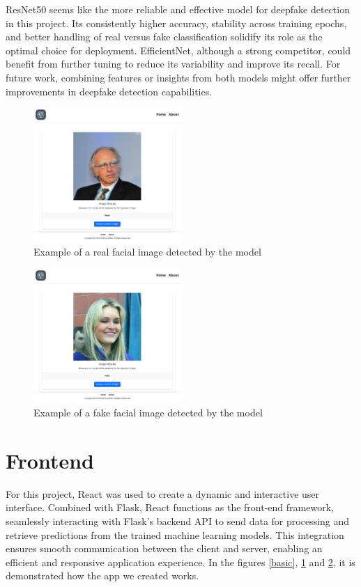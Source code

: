 \documentclass[conference]{IEEEtran}
\begin{document}
ResNet50 seems like the more reliable and effective model for deepfake detection in this project. Its consistently higher accuracy, stability across training epochs, and better handling of real versus fake classification solidify its role as the optimal choice for deployment. EfficientNet, although a strong competitor, could benefit from further tuning to reduce its variability and improve its recall. For future work, combining features or insights from both models might offer further improvements in deepfake detection capabilities.
\begin{figure}[ht]
\centering
\includegraphics[width=0.5\textwidth]{real1.jpg}
\caption{Example of a real facial image detected by the model}
\label{real1}
\end{figure}
\begin{figure}[ht]
\centering
\includegraphics[width=0.5\textwidth]{fake1.jpg}
\caption{Example of a fake facial image detected by the model}
\label{fake1}
\end{figure}
\section*{Frontend}

For this project, React was used to create a dynamic and interactive user interface. Combined with Flask, React functions as the front-end framework, seamlessly interacting with Flask's backend API to send data for processing and retrieve predictions from the trained machine learning models. This integration ensures smooth communication between the client and server, enabling an efficient and responsive application experience. In the figures \ref{basic}, \ref{real1} and \ref{fake1}, it is demonstrated how the app we created works.
\\
\end{document}
